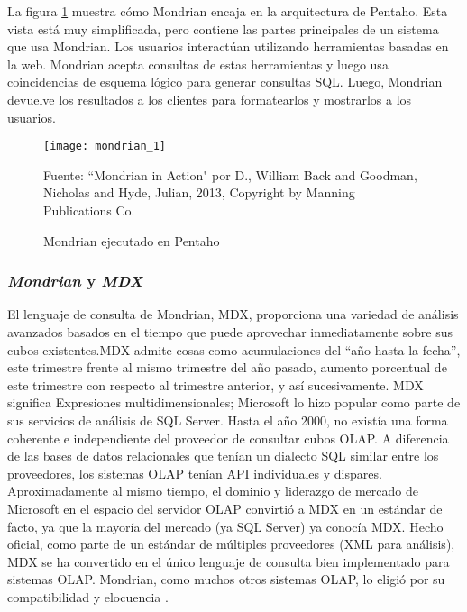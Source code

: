 \begin{spacing}{1.5}
		La figura \ref{figure:chaperII_15} muestra cómo Mondrian encaja en la arquitectura de Pentaho. Esta vista está muy simplificada, pero contiene las partes principales de un sistema que usa Mondrian.
		Los usuarios interactúan utilizando herramientas basadas en la web.
		Mondrian acepta consultas de estas herramientas y luego usa coincidencias de esquema lógico para generar consultas SQL.
		Luego, Mondrian devuelve los resultados a los clientes para formatearlos y mostrarlos a los usuarios.
		\begin{figure}[H]
			\centering
			\texttt{[image: mondrian\_1]}
			\caption {\centering \small{Mondrian ejecutado en Pentaho}} \label{figure:chaperII_15}
			\small {Fuente: ``Mondrian in Action" por D., William Back and Goodman, Nicholas and Hyde, Julian, 2013, Copyright by Manning Publications Co.}
		\end{figure}
		\subsubsection{\textit{Mondrian }y \textit{MDX}}
			El lenguaje de consulta de Mondrian, MDX, proporciona una variedad de análisis avanzados basados ​​en el tiempo que puede aprovechar inmediatamente sobre sus cubos existentes.MDX admite cosas como acumulaciones del ``año hasta la fecha'', este trimestre frente al mismo trimestre del año pasado, aumento porcentual de este trimestre con respecto al trimestre anterior, y así sucesivamente.
			MDX significa Expresiones multidimensionales; Microsoft lo hizo popular como parte de sus servicios de análisis de SQL Server. Hasta el año 2000, no existía una forma coherente e independiente del proveedor de consultar cubos OLAP. A diferencia de las bases de datos relacionales que tenían un dialecto SQL similar entre los proveedores, los sistemas OLAP tenían API individuales y dispares. Aproximadamente al mismo tiempo, el dominio y liderazgo de mercado de Microsoft en el espacio del servidor OLAP convirtió a MDX en un estándar de facto, ya que la mayoría del mercado (ya SQL Server) ya conocía MDX. Hecho oficial, como parte de un estándar de múltiples proveedores (XML para análisis), MDX se ha convertido en el único lenguaje de consulta bien implementado para sistemas OLAP. Mondrian, como muchos otros sistemas OLAP, lo eligió por su compatibilidad y elocuencia \cite{chap2_mondrian_action}.
			

\end{spacing}
